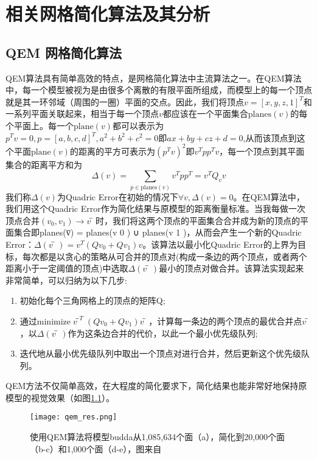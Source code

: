 
\chapter{相关网格简化算法及其分析}
\section{QEM 网格简化算法}
QEM算法\cite{qem1}\cite{qem2}具有简单高效的特点，是网格简化算法中主流算法之一。在QEM算法中，每一个模型被视为是由很多个离散的有限平面所组成，而模型上的每一个顶点就是其一环邻域（周围的一圈）平面的交点。因此，我们将顶点$v=[x,y,z,1]^T$和一系列平面关联起来，相当于每一个顶点$v$都应该在一个平面集合$\text{planes}(v)$的每个平面上。每一个$\text{plane}(v)$都可以表示为$p^Tv=0,p=[a,b,c,d]^T,a^2+b^2+c^2=0即ax+by+cz+d=0$,从而该顶点到这个平面$\text{plane}(v)$的距离的平方可表示为$(p^Tv)^2$即$v^Tpp^Tv$，每一个顶点到其平面集合的距离平方和为
\begin{equation}
  \Delta(v) = \sum_{p\in \text{planes}(v)}v^Tpp^T = v^TQ_vv
\end{equation}
我们称$\Delta(v)$为Quadric Error在初始的情况下$\forall v,\Delta(v)=0$。在QEM算法中，我们用这个Quadric
Error作为简化结果与原模型的距离衡量标准。当我每做一次顶点合并$(v_0, v_1) \to v̅$时，我们将这两个顶点的平面集合合并成为新的顶点的平面集合即planes(v̅) = planes(v 0 ) ∪ planes(v 1 )，从而会产生一个新的Quadric Error：$\Delta(v̅)=v^T(Qv_0+Qv_1)v$。该算法以最小化Quadric Error的上界为目标，每次都是以贪心的策略从可合并的顶点对(构成一条边的两个顶点，或者两个距离小于一定阈值的顶点)中选取$\Delta(v̅)$最小的顶点对做合并。该算法实现起来非常简单，可以归纳为以下几步:
\begin{enumerate}[（1）]
  \item 初始化每个三角网格上的顶点的矩阵Q;
  \item 通过$\text{minimize} \; v̅^T(Qv_0+Qv_1)v̅$，计算每一条边的两个顶点的最优合并点$v̅$ ，以$\Delta(v̅)$作为这条边合并的代价，以此一个最小优先级队列;
  \item 迭代地从最小优先级队列中取出一个顶点对进行合并，然后更新这个优先级队列。
\end{enumerate}
QEM方法不仅简单高效，在大程度的简化要求下，简化结果也能非常好地保持原模型的视觉效果（如图\ref{fig:qem-res}）。
\begin{figure}[htbp]
    \centering
    \texttt{[image: qem\_res.png]}
    \caption[QEM算法结果]{使用QEM算法将模型budda从1,085,634个面（a），简化到20,000个面（b-c）和1,000个面（d-e），图来自\cite{qem2}}
    \label{fig:qem-res}
\end{figure}

